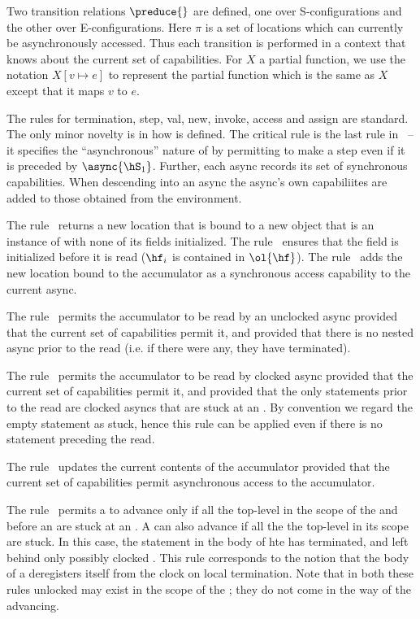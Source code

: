 Two transition relations $\preduce{}$ are defined, one over
S-configurations and the other over E-configurations. Here $\pi$ is a
set of locations which can currently be asynchronously accessed.  Thus
each transition is performed in a context that knows about the current
set of capabilities.  For $X$ a partial function, we use the notation
$X[v \mapsto e]$ to represent the partial function which is the same
as $X$ except that it maps $v$ to $e$.

The rules for termination, step, val, new, invoke, access and assign
are standard.  The only minor novelty is in how \hasync{} is
defined. The critical rule is the last rule in~ -- it
specifies the ``asynchronous'' nature of \hasync{} by permitting \hS{}
to make a step even if it is preceded by $\async{\hS_1}$. Further,
each async records its set of synchronous capabilities. When
descending into an async the async's own capabiliites are added to
those obtained from the environment.

%
The rule~ returns a new location that is bound to a new
object that is an instance of \hC{} with none of its fields initialized.
%
The rule~ ensures that the field is initialized before it is
read ($\hf_i$ is contained in $\ol{\hf}$).
%
The rule~ adds the new location bound to the
accumulator as a synchronous access capability to the current async.
%

The rule~ permits the accumulator to be read by an
unclocked async provided that the current set of capabilities permit
it, and provided that there is no nested async prior to the read
(i.e.{} if there were any, they have terminated).

The rule~ permits the accumulator to be read by 
clocked async provided that the current set of capabilities permit
it, and provided that the only statements prior to the read are
clocked asyncs that are stuck at an \hadvance. By convention we regard
the empty statement as stuck, hence this rule can be applied even if
there is no statement preceding the read. 

The rule~ updates the current contents of the
accumulator provided that the current set of capabilities permit
asynchronous access to the accumulator.

The rule~ permits a  to advance
only if all the top-level  in the scope of the
 and before an  are stuck at an
. A  can also advance if all the
the top-level  in its scope are stuck. In this
case, the statement in the body of hte  has
terminated, and left behind only possibly clocked . This
rule corresponds to the notion that the body of a  deregisters itself from the clock on local termination.
Note that in both these rules unlocked  may exist in the
scope of the ; they do not come in the way of the
 advancing.

